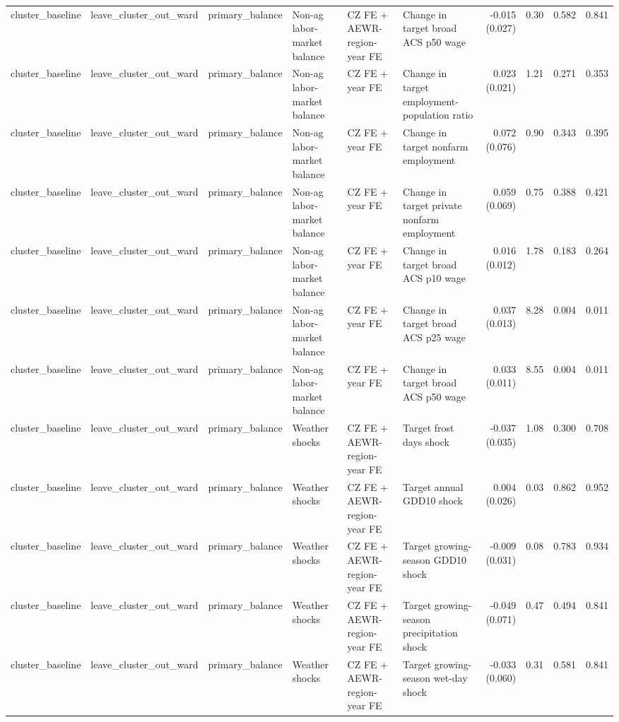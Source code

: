 \begin{tabular}{llllllrrrr}
cluster_baseline & leave_cluster_out_ward & primary_balance & Non-ag labor-market balance & CZ FE + AEWR-region-year FE & Change in target broad ACS p50 wage & -0.015 (0.027) & 0.30 & 0.582 & 0.841 \\
cluster_baseline & leave_cluster_out_ward & primary_balance & Non-ag labor-market balance & CZ FE + year FE & Change in target employment-population ratio & 0.023 (0.021) & 1.21 & 0.271 & 0.353 \\
cluster_baseline & leave_cluster_out_ward & primary_balance & Non-ag labor-market balance & CZ FE + year FE & Change in target nonfarm employment & 0.072 (0.076) & 0.90 & 0.343 & 0.395 \\
cluster_baseline & leave_cluster_out_ward & primary_balance & Non-ag labor-market balance & CZ FE + year FE & Change in target private nonfarm employment & 0.059 (0.069) & 0.75 & 0.388 & 0.421 \\
cluster_baseline & leave_cluster_out_ward & primary_balance & Non-ag labor-market balance & CZ FE + year FE & Change in target broad ACS p10 wage & 0.016 (0.012) & 1.78 & 0.183 & 0.264 \\
cluster_baseline & leave_cluster_out_ward & primary_balance & Non-ag labor-market balance & CZ FE + year FE & Change in target broad ACS p25 wage & 0.037 (0.013) & 8.28 & 0.004 & 0.011 \\
cluster_baseline & leave_cluster_out_ward & primary_balance & Non-ag labor-market balance & CZ FE + year FE & Change in target broad ACS p50 wage & 0.033 (0.011) & 8.55 & 0.004 & 0.011 \\
cluster_baseline & leave_cluster_out_ward & primary_balance & Weather shocks & CZ FE + AEWR-region-year FE & Target frost days shock & -0.037 (0.035) & 1.08 & 0.300 & 0.708 \\
cluster_baseline & leave_cluster_out_ward & primary_balance & Weather shocks & CZ FE + AEWR-region-year FE & Target annual GDD10 shock & 0.004 (0.026) & 0.03 & 0.862 & 0.952 \\
cluster_baseline & leave_cluster_out_ward & primary_balance & Weather shocks & CZ FE + AEWR-region-year FE & Target growing-season GDD10 shock & -0.009 (0.031) & 0.08 & 0.783 & 0.934 \\
cluster_baseline & leave_cluster_out_ward & primary_balance & Weather shocks & CZ FE + AEWR-region-year FE & Target growing-season precipitation shock & -0.049 (0.071) & 0.47 & 0.494 & 0.841 \\
cluster_baseline & leave_cluster_out_ward & primary_balance & Weather shocks & CZ FE + AEWR-region-year FE & Target growing-season wet-day shock & -0.033 (0.060) & 0.31 & 0.581 & 0.841 \\

\end{tabular}
